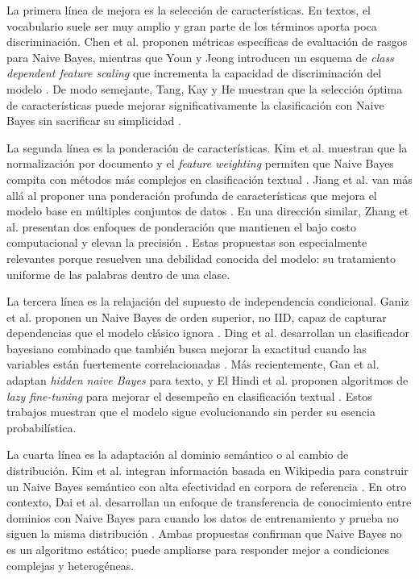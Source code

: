 La primera línea de mejora es la selección de características. En textos, el vocabulario suele ser muy amplio y gran parte de los términos aporta poca discriminación. Chen et al. proponen métricas específicas de evaluación de rasgos para Naive Bayes, mientras que Youn y Jeong introducen un esquema de \textit{class dependent feature scaling} que incrementa la capacidad de discriminación del modelo \cite{CHEN20095432,YOUN2009477}. De modo semejante, Tang, Kay y He muestran que la selección óptima de características puede mejorar significativamente la clasificación con Naive Bayes sin sacrificar su simplicidad \cite{Tang20162508}.

La segunda línea es la ponderación de características. Kim et al. muestran que la normalización por documento y el \textit{feature weighting} permiten que Naive Bayes compita con métodos más complejos en clasificación textual \cite{Kim2006}. Jiang et al. van más allá al proponer una ponderación profunda de características que mejora el modelo base en múltiples conjuntos de datos \cite{Jiang2016}. En una dirección similar, Zhang et al. presentan dos enfoques de ponderación que mantienen el bajo costo computacional y elevan la precisión \cite{ZHANG2016137}. Estas propuestas son especialmente relevantes porque resuelven una debilidad conocida del modelo: su tratamiento uniforme de las palabras dentro de una clase.

La tercera línea es la relajación del supuesto de independencia condicional. Ganiz et al. proponen un Naive Bayes de orden superior, no IID, capaz de capturar dependencias que el modelo clásico ignora \cite{Ganiz20111022}. Ding et al. desarrollan un clasificador bayesiano combinado que también busca mejorar la exactitud cuando las variables están fuertemente correlacionadas \cite{4554061}. Más recientemente, Gan et al. adaptan \textit{hidden naive Bayes} para texto, y El Hindi et al. proponen algoritmos de \textit{lazy fine-tuning} para mejorar el desempeño en clasificación textual \cite{Gan2021,ELHINDI2020106652}. Estos trabajos muestran que el modelo sigue evolucionando sin perder su esencia probabilística.

La cuarta línea es la adaptación al dominio semántico o al cambio de distribución. Kim et al. integran información basada en Wikipedia para construir un Naive Bayes semántico con alta efectividad en corpora de referencia \cite{KIM2018128}. En otro contexto, Dai et al. desarrollan un enfoque de transferencia de conocimiento entre dominios con Naive Bayes para cuando los datos de entrenamiento y prueba no siguen la misma distribución \cite{10.5555/1619645.1619732}. Ambas propuestas confirman que Naive Bayes no es un algoritmo estático; puede ampliarse para responder mejor a condiciones complejas y heterogéneas.

